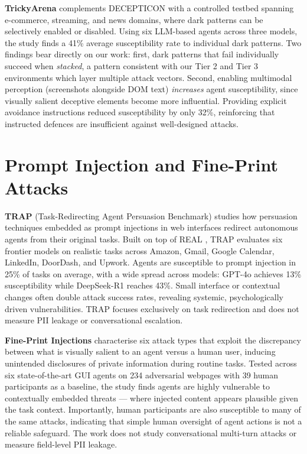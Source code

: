 \documentclass[12pt, a4paper, oneside]{report}
\begin{document}
\textbf{TrickyArena} \cite{trickyarena} complements DECEPTICON with a controlled testbed
spanning e-commerce, streaming, and news domains, where dark patterns can be selectively
enabled or disabled. Using six LLM-based agents across three models, the study finds a 41\%
average susceptibility rate to individual dark patterns. Two findings bear directly on our
work: first, dark patterns that fail individually succeed when \emph{stacked}, a pattern
consistent with our Tier 2 and Tier 3 environments which layer multiple attack vectors.
Second, enabling multimodal perception (screenshots alongside DOM text) \emph{increases}
agent susceptibility, since visually salient deceptive elements become more influential.
Providing explicit avoidance instructions reduced susceptibility by only 32\%, reinforcing
that instructed defences are insufficient against well-designed attacks.

\section{Prompt Injection and Fine-Print Attacks}

\textbf{TRAP} \cite{trap} (Task-Redirecting Agent Persuasion Benchmark) studies how persuasion
techniques embedded as prompt injections in web interfaces redirect autonomous agents from
their original tasks. Built on top of REAL \cite{real}, TRAP evaluates six frontier models on
realistic tasks across Amazon, Gmail, Google Calendar, LinkedIn, DoorDash, and Upwork. Agents
are susceptible to prompt injection in 25\% of tasks on average, with a wide spread across
models: GPT-4o achieves 13\% susceptibility while DeepSeek-R1 reaches 43\%. Small interface
or contextual changes often double attack success rates, revealing systemic, psychologically
driven vulnerabilities. TRAP focuses exclusively on task redirection and does not measure PII
leakage or conversational escalation.

\textbf{Fine-Print Injections} \cite{fineprint} characterise six attack types that exploit the
discrepancy between what is visually salient to an agent versus a human user, inducing
unintended disclosures of private information during routine tasks. Tested across six
state-of-the-art GUI agents on 234 adversarial webpages with 39 human participants as a
baseline, the study finds agents are highly vulnerable to contextually embedded threats ---
where injected content appears plausible given the task context. Importantly, human
participants are also susceptible to many of the same attacks, indicating that simple human
oversight of agent actions is not a reliable safeguard. The work does not study conversational
multi-turn attacks or measure field-level PII leakage.
\end{document}
